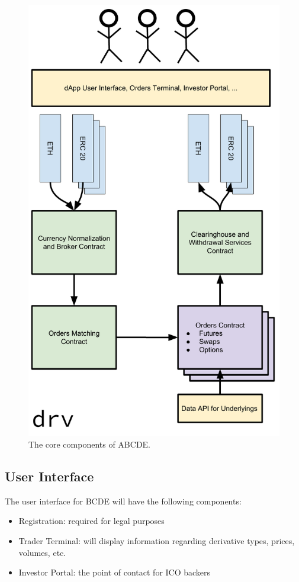 \begin{figure}
  \centering
  \includegraphics[scale=.5]{Overview.pdf}
  \caption{The core components of ABCDE.}
  \label{overview}
\end{figure}

\subsection{User Interface}
The user interface for BCDE will have the following components:
\begin{itemize}
  \item Registration: required for legal purposes
  \item Trader Terminal: will display information regarding derivative types, prices, volumes, etc.
  \item Investor Portal: the point of contact for ICO backers
\end{itemize}

